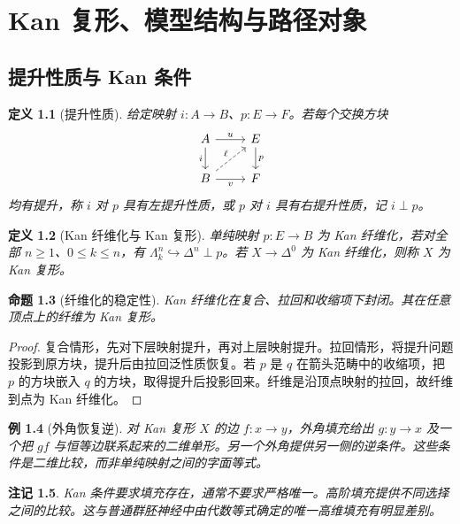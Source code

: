 \documentclass[12pt,oneside,openany,fontset=none]{ctexbook}
\theoremstyle{cn}
\newtheorem{definition}{定义}[chapter]
\newtheorem{example}[definition]{例}
\newtheorem{proposition}[definition]{命题}
\newtheorem{remark}[definition]{注记}
\numberwithin{equation}{chapter}
\begin{document}
\chapter{Kan 复形、模型结构与路径对象}
\section{提升性质与 Kan 条件}
\begin{definition}[提升性质]
给定映射 $i:A\to B$、$p:E\to F$。若每个交换方块
\[
\begin{tikzcd}
A\ar[r,"u"]\ar[d,"i"']&E\ar[d,"p"]\\
B\ar[r,"v"']\ar[ur,dashed,"\ell"]&F
\end{tikzcd}
\]
均有提升，称 $i$ 对 $p$ 具有左提升性质，或 $p$ 对 $i$ 具有右提升性质，记 $i\perp p$。
\end{definition}
\begin{definition}[Kan 纤维化与 Kan 复形]
单纯映射 $p:E\to B$ 为 Kan 纤维化，若对全部 $n\ge1$、$0\le k\le n$，有 $\Lambda_k^n\hookrightarrow\Delta^n\perp p$。若 $X\to\Delta^0$ 为 Kan 纤维化，则称 $X$ 为 Kan 复形。
\end{definition}
\begin{proposition}[纤维化的稳定性]
Kan 纤维化在复合、拉回和收缩项下封闭。其在任意顶点上的纤维为 Kan 复形。
\end{proposition}
\begin{proof}
复合情形，先对下层映射提升，再对上层映射提升。拉回情形，将提升问题投影到原方块，提升后由拉回泛性质恢复。若 $p$ 是 $q$ 在箭头范畴中的收缩项，把 $p$ 的方块嵌入 $q$ 的方块，取得提升后投影回来。纤维是沿顶点映射的拉回，故纤维到点为 Kan 纤维化。
\end{proof}
\begin{example}[外角恢复逆]
对 Kan 复形 $X$ 的边 $f:x\to y$，外角填充给出 $g:y\to x$ 及一个把 $gf$ 与恒等边联系起来的二维单形。另一个外角提供另一侧的逆条件。这些条件是二维比较，而非单纯映射之间的字面等式。
\end{example}
\begin{remark}
Kan 条件要求填充存在，通常不要求严格唯一。高阶填充提供不同选择之间的比较。这与普通群胚神经中由代数等式确定的唯一高维填充有明显差别。
\end{remark}
\end{document}

